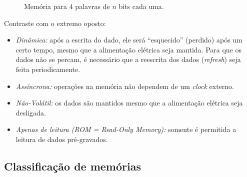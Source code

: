 \documentclass[a4paper,12pt,notitlepage]{article}
\begin{document}
\begin{figure}
\begin{center}
\caption{Memória para $4$ palavras de $n$ bits cada uma.}
\label{fig:circuitomemoria}
\end{center}
\end{figure}

Contraste com o extremo oposto:
\begin{itemize}
\item \emph{Dinâmica:} após a escrita do dado, ele será ``esquecido''
      (perdido) após um certo tempo, mesmo que a alimentação elétrica
      seja mantida. Para que os dados não se percam, é necessário que
      a reescrita dos dados (\emph{refresh}) seja feita periodicamente.
\item \emph{Assíncrona:} operações na memória não dependem de um \emph{clock}
      externo.
\item \emph{Não-Volátil:} os dados são mantidos mesmo que a alimentação
      elétrica seja desligada.
\item \emph{Apenas de leitura (ROM = Read-Only Memory):} somente é permitida
      a leitura de dados pré-gravados.
\end{itemize}

\subsection{Classificação de memórias}
\end{document}
